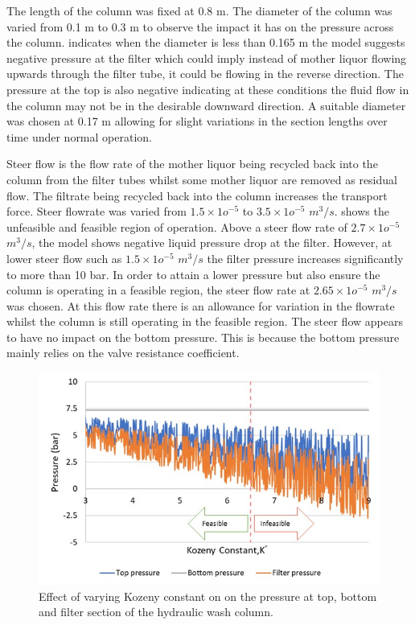 The length of the column was fixed at 0.8 m. The diameter of the column was varied from 0.1 m to 0.3 m to observe the impact it has on the pressure across the column.  indicates when the diameter is less than 0.165 m the model suggests negative pressure at the filter which could imply instead of mother liquor flowing upwards through the filter tube, it could be flowing in the reverse direction. The pressure at the top is also negative indicating at these conditions the fluid flow in the column may not be in the desirable downward direction. A suitable diameter was chosen at 0.17 m allowing for slight variations in the section lengths over time under normal operation.


Steer flow is the flow rate of the mother liquor being recycled back into the column from the filter tubes whilst some mother liquor are removed as residual flow. The filtrate being recycled back into the column increases the transport force. Steer flowrate was varied from $1.5 \times 1o^{-5}$ to $3.5 \times 1o^{-5}$ $m^{3}/s$.  shows the unfeasible and feasible region of operation. Above a steer flow rate of $2.7 \times 1o^{-5}$ $m^{3}/s$, the model shows negative liquid pressure drop at the filter. However, at lower steer flow such as $1.5 \times 1o^{-5}$ $m^{3}/s$ the filter pressure increases significantly to more than 10 bar. In order to attain a lower pressure but also ensure the column is operating in a feasible region, the steer flow rate at $2.65 \times 1o^{-5}$ $m^{3}/s$ was chosen. At this flow rate there is an allowance for variation in the flowrate whilst the column is still operating in the feasible region. The steer flow appears to have no impact on the bottom pressure. This is because the bottom pressure mainly relies on the valve resistance coefficient. 

\begin{figure}
\centering
\includegraphics[width=\linewidth]{chapters/3-separation/figures/kozeny.jpg}
\caption{Effect of varying Kozeny constant on  on the pressure at top, bottom and filter section of the hydraulic wash column.}
\label{fig:koz_col}
\end{figure}

